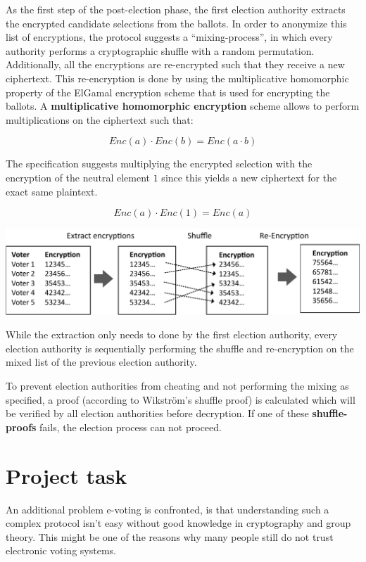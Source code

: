 As the first step of the post-election phase, the first election authority extracts the encrypted candidate selections from the ballots. In order to anonymize this list of encryptions, the protocol suggests a "`mixing-process"', in which every authority performs a cryptographic shuffle with a random permutation. Additionally, all the encryptions are re-encrypted such that they receive a new ciphertext. This re-encryption is done by using the multiplicative homomorphic property of the ElGamal encryption scheme that is used for encrypting the ballots. A \textbf{multiplicative homomorphic encryption} scheme allows to perform multiplications on the ciphertext such that:

\begin{equation*}Enc(a) \cdot Enc(b) = Enc(a \cdot b)\end{equation*}

The specification suggests multiplying the encrypted selection with the encryption of the neutral element $1$ since this yields a new ciphertext for the exact same plaintext.

\begin{equation*}Enc(a) \cdot Enc(1) = Enc(a)\end{equation*}

\begin{center}
\includegraphics[scale=0.95]{assets/mixing.pdf}
\label{Mixing}%
\end{center}

While the extraction only needs to done by the first election authority, every election authority is sequentially performing the shuffle and re-encryption on the mixed list of the previous election authority.

To prevent election authorities from cheating and not performing the mixing as specified, a proof (according to Wikström’s shuffle proof) is calculated which will be verified by all election authorities before decryption. If one of these \textbf{shuffle-proofs} fails, the election process can not proceed.

\section{Project task}
An additional problem e-voting is confronted, is that understanding such a complex protocol isn't easy without good knowledge in cryptography and group theory. This might be one of the reasons why many people still do not trust electronic voting systems. 

